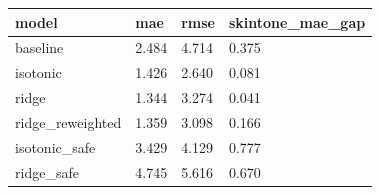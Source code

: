 \begin{tabular}{llll}
\toprule
model & mae & rmse & skintone\_mae\_gap \\
\midrule
baseline & 2.484 & 4.714 & 0.375 \\
isotonic & 1.426 & 2.640 & 0.081 \\
ridge & 1.344 & 3.274 & 0.041 \\
ridge_reweighted & 1.359 & 3.098 & 0.166 \\
isotonic_safe & 3.429 & 4.129 & 0.777 \\
ridge_safe & 4.745 & 5.616 & 0.670 \\
\bottomrule
\end{tabular}
